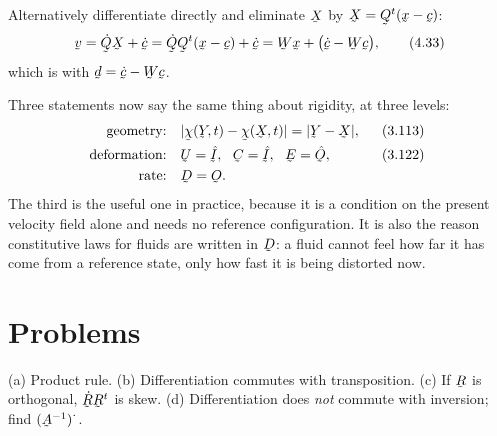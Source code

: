 Alternatively differentiate  directly and eliminate $\bX$ by
$\bX=\bQ^{t}(\bx-\bc)$:
\begin{equation}
   \bv=\dot\bQ\bX+\dot\bc=\dot\bQ\bQ^{t}(\bx-\bc)+\dot\bc
     =\bW\bx+\big(\dot\bc-\bW\bc\big),
   \tag{4.33}\label{eq:4.33}
\end{equation}
which is  with $\bd=\dot\bc-\bW\bc$.

\begin{remark}\label{rem:ch4summary}
Three statements now say the same thing about rigidity, at three levels:
\[
\begin{aligned}
   \text{geometry:}&\quad |\bchi(\bY,t)-\bchi(\bX,t)|=|\bY-\bX|,
     &&\eqr{3.113}\\
   \text{deformation:}&\quad \bU=\hI,\ \ \bC=\hI,\ \ \bE=\hOb,
     &&\eqr{3.122}\\
   \text{rate:}&\quad \bD=\Ob .&&
\end{aligned}
\]
The third is the useful one in practice, because it is a condition on the
present velocity field alone and needs no reference configuration. It is
also the reason constitutive laws for fluids are written in $\bD$: a fluid
cannot feel how far it has come from a reference state, only how fast it
is being distorted now.
\end{remark}

\setcounter{problemenv}{0}
\section{Problems}\label{sec:problems:c4}

\begin{problem}
(a) Product rule. (b) Differentiation commutes with transposition.
(c) If $\bR$ is orthogonal, $\dot\bR\bR^{t}$ is skew. (d) Differentiation
does \emph{not} commute with inversion; find
$(\bA^{-1})^{\textstyle\cdot}$.
\end{problem}

